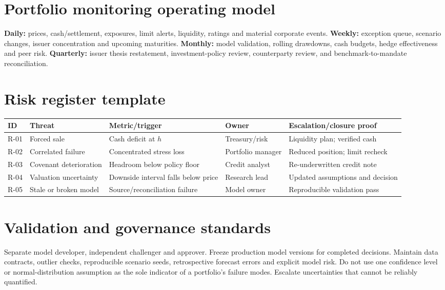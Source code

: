 \documentclass[11pt,letterpaper]{article}
\begin{document}
\section{Portfolio monitoring operating model}
\textbf{Daily:} prices, cash/settlement, exposures, limit alerts, liquidity, ratings and material corporate events. \textbf{Weekly:} exception queue, scenario changes, issuer concentration and upcoming maturities. \textbf{Monthly:} model validation, rolling drawdowns, cash budgets, hedge effectiveness and peer risk. \textbf{Quarterly:} issuer thesis restatement, investment-policy review, counterparty review, and benchmark-to-mandate reconciliation.

\section{Risk register template}
\small\begin{longtable}{@{}>{\raggedright\arraybackslash}p{}>{\raggedright\arraybackslash}p{}>{\raggedright\arraybackslash}p{}>{\raggedright\arraybackslash}p{}>{\raggedright\arraybackslash}p{}@{}}
\toprule ID & Threat & Metric/trigger & Owner & Escalation/closure proof \\
\midrule\endhead
R-01 & Forced sale & Cash deficit at $h$ & Treasury/risk & Liquidity plan; verified cash \\
R-02 & Correlated failure & Concentrated stress loss & Portfolio manager & Reduced position; limit recheck \\
R-03 & Covenant deterioration & Headroom below policy floor & Credit analyst & Re-underwritten credit note \\
R-04 & Valuation uncertainty & Downside interval falls below price & Research lead & Updated assumptions and decision \\
R-05 & Stale or broken model & Source/reconciliation failure & Model owner & Reproducible validation pass \\
\bottomrule\end{longtable}\normalsize

\section{Validation and governance standards}
Separate model developer, independent challenger and approver. Freeze production model versions for completed decisions. Maintain data contracts, outlier checks, reproducible scenario seeds, retrospective forecast errors and explicit model risk. Do not use one confidence level or normal-distribution assumption as the sole indicator of a portfolio's failure modes. Escalate uncertainties that cannot be reliably quantified.
\end{document}
